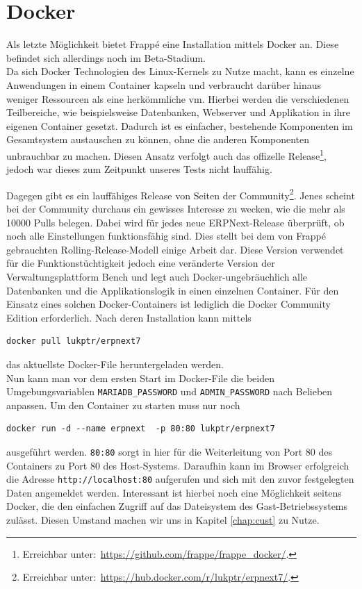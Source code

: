 \section{Docker}
Als letzte Möglichkeit bietet Frappé eine Installation mittels Docker an. Diese befindet sich allerdings noch im Beta-Stadium. \\
Da sich Docker Technologien des Linux-Kernels zu Nutze macht, kann es einzelne Anwendungen in einem Container kapseln und verbraucht darüber hinaus weniger Ressourcen als eine herkömmliche \gls{vm}. 
Hierbei werden die verschiedenen Teilbereiche, wie beispielsweise Datenbanken, Webserver und Applikation in ihre eigenen Container gesetzt. Dadurch ist es einfacher, bestehende Komponenten im Gesamtsystem austauschen zu können, ohne die anderen Komponenten unbrauchbar zu machen. 
Diesen Ansatz verfolgt auch das offizelle Release\footnote{Erreichbar unter:\ \url{https://github.com/frappe/frappe_docker/}.}, jedoch war dieses zum Zeitpunkt unseres Tests nicht lauffähig.

Dagegen gibt es ein lauffähiges Release von Seiten der Community\footnote{Erreichbar unter:\ \url{https://hub.docker.com/r/lukptr/erpnext7/}.}. Jenes scheint bei der Community durchaus ein gewisses Interesse zu wecken, wie die mehr als 10000 Pulls belegen. Dabei wird für jedes neue ERPNext-Release überprüft, ob noch alle Einstellungen funktionsfähig sind. Dies stellt bei dem von Frappé gebrauchten Rolling-Release-Modell einige Arbeit dar. Diese Version verwendet für die Funktionstüchtigkeit jedoch eine veränderte Version der Verwaltungsplattform Bench und legt auch Docker-ungebräuchlich alle Datenbanken und die Applikationslogik in einen einzelnen Container.
Für den Einsatz eines solchen Docker-Containers ist lediglich die Docker Community Edition erforderlich. Nach deren Installation kann mittels 
\begin{verbatim}
docker pull lukptr/erpnext7
\end{verbatim}
das aktuellste Docker-File heruntergeladen werden.\\
Nun kann man vor dem ersten Start im Docker-File die beiden Umgebungsvariablen \texttt{MARIADB\_PASSWORD} und \texttt{ADMIN\_PASSWORD} nach Belieben anpassen.
Um den Container zu starten muss nur noch 
\begin{verbatim}
docker run -d --name erpnext  -p 80:80 lukptr/erpnext7
\end{verbatim}
ausgeführt werden. \texttt{80:80} sorgt in hier für die Weiterleitung von Port 80 des Containers zu Port 80 des Host-Systems. Daraufhin kann im Browser erfolgreich die Adresse \texttt{http://localhost:80} aufgerufen und sich mit den zuvor festgelegten Daten angemeldet werden.
Interessant ist hierbei noch eine Möglichkeit seitens Docker, die den einfachen Zugriff auf das Dateisystem des Gast-Betriebssystems zulässt. Diesen Umstand machen wir uns in Kapitel \ref{chap:cust} zu Nutze.

